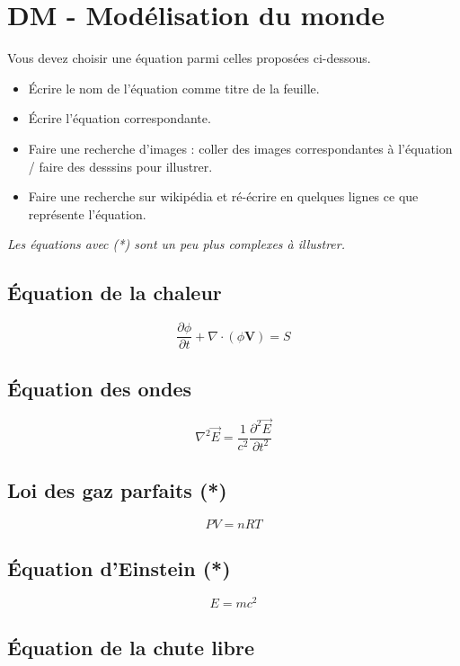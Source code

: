 




\horrule{2px}
\section*{DM - Modélisation du monde}
\horrule{2px}

Vous devez choisir une équation parmi celles proposées ci-dessous.

\begin{itemize}[label={$\bullet$}]
  \item Écrire le nom de l'équation comme titre de la feuille.
  \item Écrire l'équation correspondante.
  \item Faire une recherche d'images : coller des images correspondantes à l'équation / faire des desssins pour illustrer.
  \item Faire une recherche sur wikipédia et ré-écrire en quelques lignes ce que représente l'équation. 
\end{itemize} 


\textit{Les équations avec (*) sont un peu plus complexes à illustrer.}

\subsection*{Équation de la chaleur}

$$ \frac {\partial \phi }{\partial t} +\nabla \cdot (\phi \mathbf {V} )=S $$

\subsection*{Équation des ondes}

$$ \nabla ^{2}{\vec {E}} = {\frac {1}{c^{2}}}{\frac {\partial ^{2}{\vec {E}}}{\partial t^{2}}} $$

\subsection*{Loi des gaz parfaits (*)}

$$ PV = nRT $$


\subsection*{Équation d'Einstein (*)}

$$ E = mc^2 $$

\subsection*{Équation de la chute libre}

